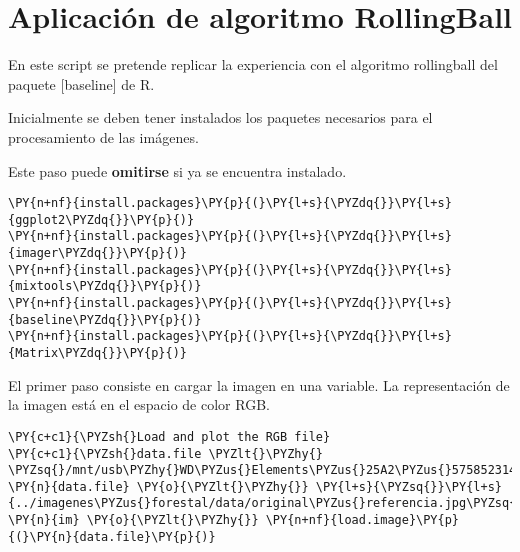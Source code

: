 

%
    
    
    

    
    \hypertarget{aplicaciuxf3n-de-algoritmo-rollingball}{%
\section{Aplicación de algoritmo
RollingBall}\label{aplicaciuxf3n-de-algoritmo-rollingball}}

En este script se pretende replicar la experiencia con el algoritmo
rollingball del paquete {[}baseline{]} de R.

    Inicialmente se deben tener instalados los paquetes necesarios para el
procesamiento de las imágenes.

Este paso puede \textbf{omitirse} si ya se encuentra instalado.

    \begin{tcolorbox}[breakable, size=fbox, boxrule=1pt, pad at break*=1mm,colback=cellbackground, colframe=cellborder]
\begin{Verbatim}[commandchars=\\\{\}]
\PY{n+nf}{install.packages}\PY{p}{(}\PY{l+s}{\PYZdq{}}\PY{l+s}{ggplot2\PYZdq{}}\PY{p}{)}
\PY{n+nf}{install.packages}\PY{p}{(}\PY{l+s}{\PYZdq{}}\PY{l+s}{imager\PYZdq{}}\PY{p}{)}
\PY{n+nf}{install.packages}\PY{p}{(}\PY{l+s}{\PYZdq{}}\PY{l+s}{mixtools\PYZdq{}}\PY{p}{)}
\PY{n+nf}{install.packages}\PY{p}{(}\PY{l+s}{\PYZdq{}}\PY{l+s}{baseline\PYZdq{}}\PY{p}{)}
\PY{n+nf}{install.packages}\PY{p}{(}\PY{l+s}{\PYZdq{}}\PY{l+s}{Matrix\PYZdq{}}\PY{p}{)}
\end{Verbatim}
\end{tcolorbox}

   

    El primer paso consiste en cargar la imagen en una variable. La
representación de la imagen está en el espacio de color RGB.

    \begin{tcolorbox}[breakable, size=fbox, boxrule=1pt, pad at break*=1mm,colback=cellbackground, colframe=cellborder]
\begin{Verbatim}[commandchars=\\\{\}]
\PY{c+c1}{\PYZsh{}Load and plot the RGB file}
\PY{c+c1}{\PYZsh{}data.file \PYZlt{}\PYZhy{} \PYZsq{}/mnt/usb\PYZhy{}WD\PYZus{}Elements\PYZus{}25A2\PYZus{}575852314531383859503438\PYZhy{}0:0\PYZhy{}part1/CHB/PASANTIA/imagenes\PYZus{}forestal/data/DJI\PYZus{}0805.jpg\PYZsq{}}
\PY{n}{data.file} \PY{o}{\PYZlt{}\PYZhy{}} \PY{l+s}{\PYZsq{}}\PY{l+s}{../imagenes\PYZus{}forestal/data/original\PYZus{}referencia.jpg\PYZsq{}}
\PY{n}{im} \PY{o}{\PYZlt{}\PYZhy{}} \PY{n+nf}{load.image}\PY{p}{(}\PY{n}{data.file}\PY{p}{)}
\end{Verbatim}
\end{tcolorbox}

